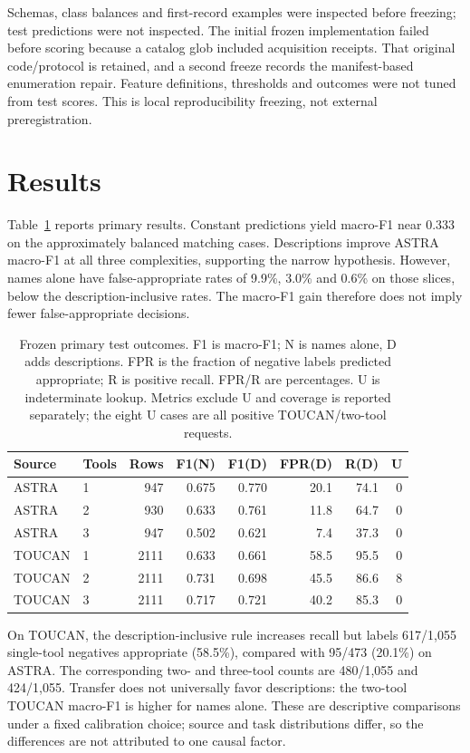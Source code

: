 \documentclass[sigconf,nonacm]{acmart}
\begin{document}
Schemas, class balances and first-record examples were inspected before freezing; test predictions were not inspected. The initial frozen implementation failed before scoring because a catalog glob included acquisition receipts. That original code/protocol is retained, and a second freeze records the manifest-based enumeration repair. Feature definitions, thresholds and outcomes were not tuned from test scores. This is local reproducibility freezing, not external preregistration.

\section{Results}
Table~\ref{tab:transfer} reports primary results. Constant predictions yield macro-F1 near 0.333 on the approximately balanced matching cases. Descriptions improve ASTRA macro-F1 at all three complexities, supporting the narrow hypothesis. However, names alone have false-appropriate rates of 9.9\%, 3.0\% and 0.6\% on those slices, below the description-inclusive rates. The macro-F1 gain therefore does not imply fewer false-appropriate decisions.

\begin{table}[t]
\caption{Frozen primary test outcomes. F1 is macro-F1; N is names alone, D adds descriptions. FPR is the fraction of negative labels predicted appropriate; R is positive recall. FPR/R are percentages. U is indeterminate lookup. Metrics exclude U and coverage is reported separately; the eight U cases are all positive TOUCAN/two-tool requests.}
\label{tab:transfer}\centering\scriptsize
\begin{tabular}{llrrrrrr}\toprule
Source & Tools & Rows & F1(N) & F1(D) & FPR(D) & R(D) & U\\\midrule
ASTRA & 1 & 947 & 0.675 & 0.770 & 20.1 & 74.1 & 0 \\
ASTRA & 2 & 930 & 0.633 & 0.761 & 11.8 & 64.7 & 0 \\
ASTRA & 3 & 947 & 0.502 & 0.621 & 7.4 & 37.3 & 0 \\
TOUCAN & 1 & 2111 & 0.633 & 0.661 & 58.5 & 95.5 & 0 \\
TOUCAN & 2 & 2111 & 0.731 & 0.698 & 45.5 & 86.6 & 8 \\
TOUCAN & 3 & 2111 & 0.717 & 0.721 & 40.2 & 85.3 & 0 \\
\bottomrule\end{tabular}
\end{table}

On TOUCAN, the description-inclusive rule increases recall but labels 617/1,055 single-tool negatives appropriate (58.5\%), compared with 95/473 (20.1\%) on ASTRA. The corresponding two- and three-tool counts are 480/1,055 and 424/1,055. Transfer does not universally favor descriptions: the two-tool TOUCAN macro-F1 is higher for names alone. These are descriptive comparisons under a fixed calibration choice; source and task distributions differ, so the differences are not attributed to one causal factor.
\end{document}
